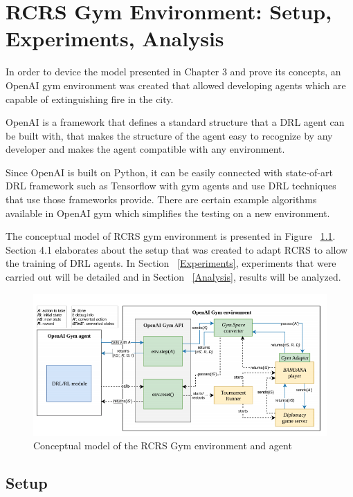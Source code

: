 \documentclass[12pt]{report}
\begin{document}
\chapter{RCRS Gym Environment: Setup, Experiments, Analysis}

In order to device the model presented in Chapter 3 and prove its concepts, an OpenAI gym environment \cite{brockman2016openai} was created that allowed developing agents which are capable of extinguishing fire in the city. 

OpenAI is a framework that defines a standard structure that a DRL agent can be built with, that makes the structure of the agent easy to recognize by any developer and makes the agent compatible with any environment. 

Since OpenAI is built on Python, it can be easily connected with state-of-art DRL framework such as Tensorflow \cite{Abadi} with gym agents and use DRL techniques that use those frameworks provide. There are certain example algorithms available in OpenAI gym which simplifies the testing on a new environment. 


The conceptual model of RCRS gym environment is presented in Figure ~\ref{fig:OpenAIgymRCRS}. Section 4.1 elaborates about the setup that was created to adapt RCRS to allow the training of DRL agents. In Section ~\ref{Experiments}, experiments that were carried out will be detailed and in Section ~\ref{Analysis}, results will be analyzed. 

\begin{figure}[!h]
    \centering
    \includegraphics[width=14cm]{OpenAIgymRCRS.png}
    \caption{Conceptual model of the RCRS Gym environment and agent}
    \label{fig:OpenAIgymRCRS}
\end{figure}

\section{Setup} \label{Setup}
\end{document}
